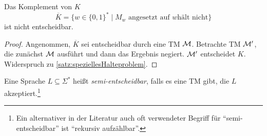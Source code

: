 \begin{Korollar}\label{kor:6.11_alt}
    Das Komplement von $K$
  $$\overline{K} = \{w \in\{0,1\}^* \mid M_w\text{ angesetzt auf }w\text{
        hält nicht} \}$$
  ist nicht entscheidbar.
\end{Korollar}
\begin{proof}
	Angenommen, $\overline{K}$ sei entscheidbar durch eine \ac{TM} $\mathcal{M}$.
	Betrachte \ac{TM} $\mathcal{M}'$, die zunächst $\mathcal{M}$ ausführt und dann das Ergebnis negiert.
	$\mathcal{M}'$ entscheidet $K$.
	Widerspruch zu \autoref{satz:speziellesHalteproblem}.
\end{proof}




\begin{Def}[name={[Semi-Entscheidbarkeit]}]
	Eine Sprache $L\subseteq\Sigma^*$ heißt \emph{semi-entscheidbar}, falls es eine \ac{TM} gibt, die $L$ akzeptiert.\footnote{
	Ein alternativer in der Literatur auch oft verwendeter Begriff für "`semi-entscheidbar"' ist "`rekursiv aufzählbar"'.}
\end{Def}


